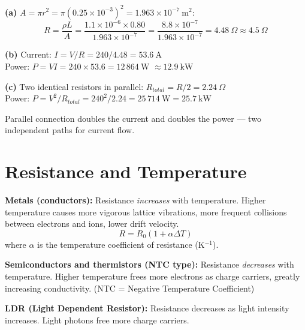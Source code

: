\begin{solutionbox}
\textbf{(a)} $A = \pi r^2 = \pi(0.25\times10^{-3})^2
= 1.963\times10^{-7}\ \text{m}^2$:
\[
  R = \frac{\rho L}{A}
  = \frac{1.1\times10^{-6} \times 0.80}
    {1.963\times10^{-7}}
  = \frac{8.8\times10^{-7}}{1.963\times10^{-7}}
  = 4.48\ \Omega \approx 4.5\ \Omega
\]

\textbf{(b)} Current: $I = V/R = 240/4.48
= 53.6\ \text{A}$\\
Power: $P = VI = 240 \times 53.6 = 12\,864\ \text{W}$
$\approx 12.9\ \text{kW}$

\textbf{(c)} Two identical resistors in parallel:
$R_{total} = R/2 = 2.24\ \Omega$\\
Power: $P = V^2/R_{total} = 240^2/2.24
= 25\,714\ \text{W} = 25.7\ \text{kW}$

Parallel connection doubles the current and
doubles the power --- two independent paths for
current flow.
\end{solutionbox}

\section{Resistance and Temperature}

\begin{defbox}
\textbf{Metals (conductors):}
Resistance \textit{increases} with temperature.
Higher temperature causes more vigorous lattice
vibrations, more frequent collisions between
electrons and ions, lower drift velocity.
\[
  R = R_0(1 + \alpha\Delta T)
\]
where $\alpha$ is the temperature coefficient of
resistance (K$^{-1}$).

\textbf{Semiconductors and thermistors (NTC type):}
Resistance \textit{decreases} with temperature.
Higher temperature frees more electrons as charge
carriers, greatly increasing conductivity.
(NTC = Negative Temperature Coefficient)

\textbf{LDR (Light Dependent Resistor):}
Resistance decreases as light intensity increases.
Light photons free more charge carriers.
\end{defbox}

